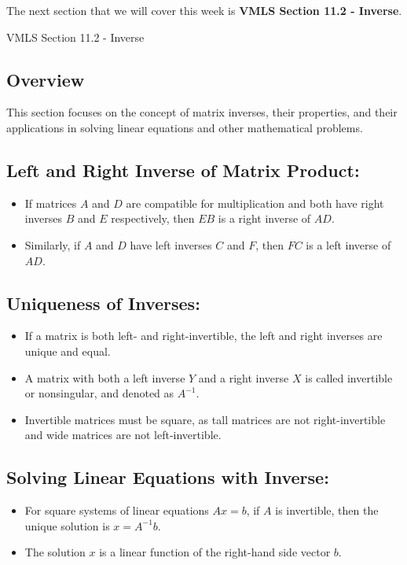 The next section that we will cover this week is \textbf{VMLS Section 11.2 - Inverse}.

\begin{notes}{VMLS Section 11.2 - Inverse}
    \subsection*{Overview}

    This section focuses on the concept of matrix inverses, their properties, and their applications in solving linear equations and other mathematical problems. \vspace*{1em}

    \subsection*{Left and Right Inverse of Matrix Product:}
    \begin{itemize}
        \item If matrices $A$ and $D$ are compatible for multiplication and both have right inverses $B$ and $E$ respectively, then $EB$ is a right inverse of $AD$.
        \item Similarly, if $A$ and $D$ have left inverses $C$ and $F$, then $FC$ is a left inverse of $AD$.
    \end{itemize}

    \subsection*{Uniqueness of Inverses:}
    \begin{itemize}
        \item If a matrix is both left- and right-invertible, the left and right inverses are unique and equal.
        \item A matrix with both a left inverse $Y$ and a right inverse $X$ is called invertible or nonsingular, and denoted as $A^{-1}$.
        \item Invertible matrices must be square, as tall matrices are not right-invertible and wide matrices are not left-invertible.
    \end{itemize}

    \subsection*{Solving Linear Equations with Inverse:}
    \begin{itemize}
        \item For square systems of linear equations $Ax = b$, if $A$ is invertible, then the unique solution is $x = A^{-1}b$.
        \item The solution $x$ is a linear function of the right-hand side vector $b$.
    \end{itemize}


\end{notes}
